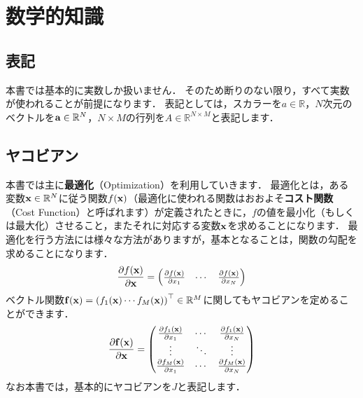 \section{数学的知識}

\subsection{表記}

本書では基本的に実数しか扱いません．
そのため断りのない限り，すべて実数が使われることが前提になります．
表記としては，スカラーを$a \in \mathbb{R}$，$N$次元のベクトルを${\bf a} \in \mathbb{R}^{N}$，$N \times M$の行列を$A \in \mathbb{R}^{N \times M}$と表記します．





\subsection{ヤコビアン}

本書では主に{\bf 最適化}（Optimization）を利用していきます．
最適化とは，ある変数${\bf x} \in \mathbb{R}^{N}$に従う関数$f({\bf x})$（最適化に使われる関数はおおよそ{\bf コスト関数}（Cost Function）と呼ばれます）が定義されたときに，$f$の値を最小化（もしくは最大化）させること，またそれに対応する変数${\bf x}$を求めることになります．
最適化を行う方法には様々な方法がありますが，基本となることは，関数の勾配を求めることになります．
%
\begin{align}
  \frac{ \partial f({\bf x}) }{ \partial {\bf x} } =
  \left( \begin{matrix}
    \frac{ \partial f({\bf x}) }{ \partial x_{1} } &
    \cdots                                         &
    \frac{ \partial f({\bf x}) }{ \partial x_{N} }
  \end{matrix} \right)
  \label{eq:scholar_function_jacobian}
\end{align}
%
ベクトル関数${\bf f}({\bf x}) = \left( f_{1}({\bf x}) \cdots f_{M}({\bf x}) \right)^{\top} \in \mathbb{R}^{M}$に関してもヤコビアンを定めることができます．
%
\begin{align}
  \frac{ \partial {\bf f}({\bf x}) }{ \partial {\bf x} } =
  \left( \begin{matrix}
    \frac{ \partial f_{1}({\bf x}) }{ \partial x_{1} } &
    \cdots                                             &
    \frac{ \partial f_{1}({\bf x}) }{ \partial x_{N} } \\
    \vdots                                             &
    \ddots                                             &
    \vdots                                             \\
    \frac{ \partial f_{M}({\bf x}) }{ \partial x_{1} } &
    \cdots                                             &
    \frac{ \partial f_{M}({\bf x}) }{ \partial x_{N} } \\
  \end{matrix} \right)
  \label{eq:vector_function_jacobian}
\end{align}
%
なお本書では，基本的にヤコビアンを$J$と表記します．

